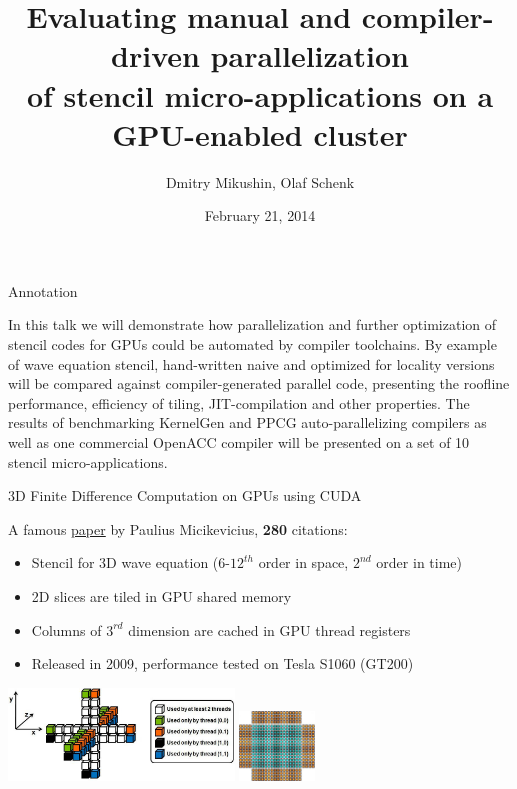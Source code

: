 \documentclass[aspectratio=169]{beamer}
\title[GPU parallelizing compiler]{Evaluating manual and compiler-driven parallelization\\ of stencil micro-applications on a GPU-enabled cluster}
\author{Dmitry Mikushin, Olaf Schenk}
\institute{}
\date{February 21, 2014}
\begin{document}
\begin{frame}
\titlepage
\end{frame}



\begin{frame}[fragile]{Annotation}

\begin{minipage}{15cm}
In this talk we will demonstrate how parallelization and further optimization of stencil codes for GPUs could be automated by compiler toolchains. By example of wave equation stencil, hand-written naive and optimized for locality versions will be compared against compiler-generated parallel code, presenting the roofline performance, efficiency of tiling, JIT-compilation and other properties. The results of benchmarking KernelGen and PPCG auto-parallelizing compilers as well as one commercial OpenACC compiler will be presented on a set of 10 stencil micro-applications.%
\end{minipage}

\end{frame}



\begin{frame}[fragile]{3D Finite Difference Computation on GPUs using CUDA}

\begin{minipage}{8.5cm}
A famous \href{http://developer.download.nvidia.com/CUDA/CUDA_Zone/papers/gpu_3dfd_rev.pdf}{paper} by Paulius Micikevicius, \textbf{280} citations:
\vskip5pt
\begin{itemize}
\item Stencil for 3D wave equation ($6$-$12^{th}$ order in space, $2^{nd}$ order in time)
\item 2D slices are tiled in GPU shared memory
\item Columns of $3^{rd}$ dimension are cached in GPU thread registers
\item Released in 2009, performance tested on Tesla S1060 (GT200)
\end{itemize}
\end{minipage}%
\hskip0.5cm
\begin{minipage}{6cm}
\includegraphics[width=6cm]{figures/paulius_fig2}
\vskip10pt
\hskip3.85cm\includegraphics[width=2cm]{figures/paulius_fig1}
\end{minipage}

\end{frame}
\end{document}
